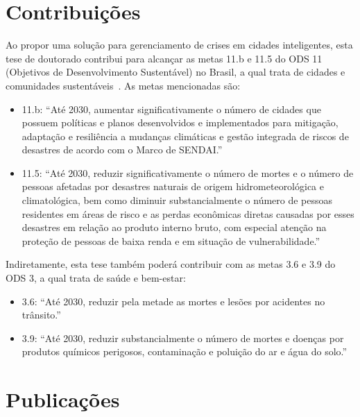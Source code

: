 \begin{refsection}
\section{Contribuições}\label{sec:contribuicoes}

Ao propor uma solução para gerenciamento de crises em cidades inteligentes, esta tese de doutorado contribui para alcançar as metas 11.b e 11.5 do ODS 11 (Objetivos de Desenvolvimento Sustentável) no Brasil, a qual trata de cidades e comunidades sustentáveis~\cite{ipeaods}. As metas mencionadas são:

\begin{itemize}
  \item 11.b: ``Até 2030, aumentar significativamente o número de cidades que possuem políticas e planos desenvolvidos e implementados para mitigação, adaptação e resiliência a mudanças climáticas e gestão integrada de riscos de desastres de acordo com o Marco de SENDAI.''
  \item 11.5: ``Até 2030, reduzir significativamente o número de mortes e o número de pessoas afetadas por desastres naturais de origem hidrometeorológica e climatológica, bem como diminuir substancialmente o número de pessoas residentes em áreas de risco e as perdas econômicas diretas causadas por esses desastres em relação ao produto interno bruto, com especial atenção na proteção de pessoas de baixa renda e em situação de vulnerabilidade.''
\end{itemize}

Indiretamente, esta tese também poderá contribuir com as metas 3.6 e 3.9 do ODS 3, a qual trata de saúde e bem-estar:

\begin{itemize}
  \item 3.6: ``Até 2030, reduzir pela metade as mortes e lesões por acidentes no trânsito.''
  \item 3.9: ``Até 2030, reduzir substancialmente o número de mortes e doenças por produtos químicos perigosos, contaminação e poluição do ar e água do solo.''
\end{itemize}

\section{Publicações}\label{sec:publicacoes}


\end{refsection}
